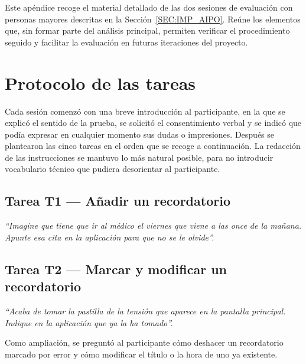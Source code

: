 
Este apéndice recoge el material detallado de las dos sesiones de
evaluación con personas mayores descritas en la
Sección~\ref{SEC:IMP_AIPO}. Reúne los elementos que, sin formar parte del
análisis principal, permiten verificar el procedimiento seguido y facilitar
la evaluación en futuras iteraciones del proyecto.


\section{Protocolo de las
tareas\label{SEC:APP_PROTOCOLO}}

Cada sesión comenzó con una breve introducción al participante, en la que
se explicó el sentido de la prueba, se solicitó el consentimiento verbal
y se indicó que podía expresar en cualquier momento sus dudas o
impresiones. Después se plantearon las cinco tareas en el orden que se
recoge a continuación. La redacción de las instrucciones se mantuvo lo más
natural posible, para no introducir vocabulario técnico que pudiera desorientar al participante.

\subsection{Tarea T1 — Añadir un recordatorio}

\emph{``Imagine que tiene que ir al médico el viernes que viene a
las once de la mañana. Apunte esa cita en la aplicación para que
no se le olvide''.}

\subsection{Tarea T2 — Marcar y modificar un recordatorio}

\emph{``Acaba de tomar la pastilla de la tensión que aparece en
la pantalla principal. Indique en la aplicación que ya la ha
tomado''.}

Como ampliación, se preguntó al participante cómo deshacer un
recordatorio marcado por error y cómo modificar el título o la hora de
uno ya existente.

